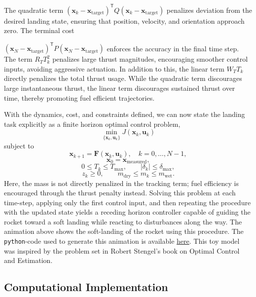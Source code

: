 \documentclass[12pt]{article}
\def\x{\mathbf{x}}
\def\u{\mathbf{u}}
\def\T{\mathsf{T}}
\begin{document}
The quadratic term $(\x_k - \x_{\text{target}})^\T Q (\x_k - \x_{\text{target}})$ penalizes deviation from the desired landing state, ensuring that position, velocity, and orientation approach zero. The terminal cost {$(\x_N - \x_{\text{target}})^\T P (\x_N - \x_{\text{target}})$ enforces the accuracy in the final time step. The term $R_T T_k^2$ penalizes large thrust magnitudes, encouraging smoother control inputs, avoiding aggressive actuation. In addition to this, the linear term $W_T T_k$ directly penalizes the total thrust usage. While the quadratic term discourages large instantaneous thrust, the linear term discourages sustained thrust over time, thereby promoting fuel efficient trajectories. 

With the dynamics, cost, and constraints defined, we can now state the landing task explicitly as a finite horizon optimal control problem,
\[
\min_{\{\x_k, \u_k\}} J (\x_k, \u_k)
\]
subject to
\[
\x_{k+1} = \mathbf{F}(\x_k, \u_k), \quad k=0,\dots,N-1,
\]
\[
\x_0 = \x_{\text{measured}},
\]
\[
0 \le T_k \le T_{\max}, \qquad |\delta_k| \le \delta_{\max},
\]
\[
z_k \ge 0, \qquad m_{\text{dry}} \le m_k \le m_{\text{wet}}.
\]
Here, the mass is not directly penalized in the tracking term; fuel efficiency is encouraged through the thrust penalty instead. Solving this problem at each time-step, applying only the first control input, and then repeating the procedure with the updated state yields a receding horizon controller capable of guiding the rocket toward a soft landing while reacting to disturbances along the way. The animation above shows the soft-landing of the rocket using this procedure. The \texttt{python}-code used to generate this animation is available \href{https://github.com/sgangaprasath/MPCTutorial/blob/main/CasADi/RocketMPC.py}{here}. This toy model was inspired by the problem set in Robert Stengel's book on Optimal Control and Estimation.
\subsection*{Computational Implementation}

}
\end{document}
